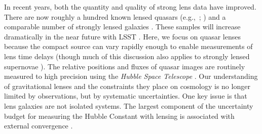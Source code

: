 In recent years, both the quantity and quality of strong lens data have improved. There are now roughly a hundred known lensed quasars (e.g.,\ ; \citealt{SQLS,CLASS}) and a comparable number of strongly lensed galaxies \citep[e.g.,][]{Bolton08,Cassowary}. These samples will increase dramatically in the near future with LSST \citep[e.g.,][]{LSST, Coe09, Oguri10, Collett15}. Here, we focus on quasar lenses because the compact source can vary rapidly enough to enable measurements of lens time delays (though much of this discussion also applies to strongly lensed supernovae \citealt{Kelly15}). The relative positions and fluxes of quasar images are routinely measured to high precision using the \textit{Hubble Space Telescope} \citep[e.g,.][and references therein; CASTLeS Collaboration]{Lehar00,Sluse12}. Our understanding of gravitational lenses and the constraints they place on cosmology is no longer limited by observations, but by systematic uncertainties. One key issue is that lens galaxies are not isolated systems. The largest component of the uncertainty budget for measuring the Hubble Constant with lensing is associated with external convergence \citep{Suyu12}.
  
  